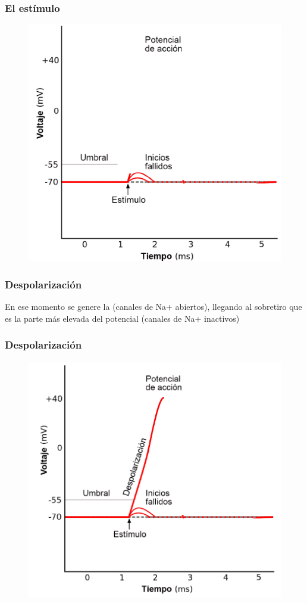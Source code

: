 \documentclass[14pt]{beamer}
\begin{document}
\begin{frame}
\frametitle{El estímulo}
\begin{figure}
    \centering
    \includegraphics[scale=0.5]{Imagenes/Potencial_Accion_08b.png}
\end{figure}
\end{frame}
\begin{frame}
\frametitle{Despolarización}
En ese momento se genere la  (canales de Na+ abiertos), \pause llegando al sobretiro que es la parte más elevada del potencial (canales de Na+ inactivos)
\end{frame}
\begin{frame}
\frametitle{Despolarización}
\begin{figure}
    \centering
    \includegraphics[scale=0.58]{Imagenes/Potencial_Accion_08c.png}
\end{figure}
\end{frame}
\end{document}
